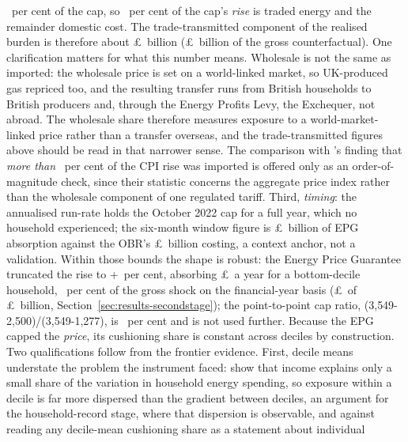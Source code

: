 \MsEnergyWholesaleShareCapPeakPct\ per cent of the cap, so
\MsEnergyWholesaleShareOfRisePct\ per cent of the cap's \emph{rise} is
traded energy and the remainder domestic cost. The trade-transmitted
component of the realised burden is therefore about
\pounds\MsEnergyRealisedTradeTransmittedAggBn\ billion
(\pounds\MsEnergyTradeTransmittedAggBn\ billion of the gross
counterfactual). One clarification matters for what this number means. Wholesale is not
the same as imported: the wholesale price is set on a world-linked
market, so UK-produced gas repriced too, and the resulting transfer
runs from British households to British producers and, through the
Energy Profits Levy, the Exchequer, not abroad. The wholesale share
therefore measures exposure to a world-market-linked price rather than
a transfer overseas, and the trade-transmitted figures above should be
read in that narrower sense. The comparison with
\citet{dhingrapage2023}'s finding that \emph{more than}
\MsEnergyImportedShareLowerBound\ per cent of the CPI rise was imported
is offered only as an order-of-magnitude check, since their statistic
concerns the aggregate price index rather than the wholesale component
of one regulated tariff. Third,
\emph{timing}: the annualised run-rate holds the October 2022 cap for
a full year, which no household experienced; the six-month window
figure is \pounds\MsEnergyCushionAggSixMonthsBn\ billion of EPG
absorption against the OBR's \pounds\MsEnergyObrEpgBn\ billion
costing, a context anchor, not a validation. Within those bounds the shape is
robust: the Energy Price Guarantee truncated the rise to
+\MsEnergyNetFactorPct\ per cent, absorbing
\pounds\MsEnergyCushionGbpDecOne\ a year for a bottom-decile
household, \MsEnergyCushionShareFyPct\ per cent of the gross shock on
the financial-year basis (\pounds\SsEpgBn\ of \pounds\SsCounterAggBn\
billion, Section~\ref{sec:results-secondstage}); the point-to-point
cap ratio, (3{,}549-2{,}500)/(3{,}549-1{,}277), is
\MsEnergyCushionSharePct\ per cent and is not used further.
Because the EPG capped the \emph{price}, its cushioning share is
constant across deciles by construction. Two qualifications follow
from the frontier evidence. First, decile means understate the
problem the instrument faced: \citet{levell2025} show that income
explains only a small share of the variation in household energy
spending, so exposure within a decile is far more dispersed than the
gradient between deciles, an argument for the household-record stage,
where that dispersion is observable, and against reading any
decile-mean cushioning share as a statement about individual
